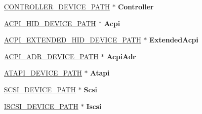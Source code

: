 \begin{DoxyCompactItemize}
\hyperlink{struct_c_o_n_t_r_o_l_l_e_r___d_e_v_i_c_e___p_a_t_h}{C\+O\+N\+T\+R\+O\+L\+L\+E\+R\+\_\+\+D\+E\+V\+I\+C\+E\+\_\+\+P\+A\+TH} $\ast$ {\bfseries Controller}
\item 
\mbox{\label{union_e_f_i___d_e_v___p_a_t_h___p_t_r_a564ac07625de5286d1533085b8459fb6}} 
\hyperlink{struct_a_c_p_i___h_i_d___d_e_v_i_c_e___p_a_t_h}{A\+C\+P\+I\+\_\+\+H\+I\+D\+\_\+\+D\+E\+V\+I\+C\+E\+\_\+\+P\+A\+TH} $\ast$ {\bfseries Acpi}
\item 
\mbox{\label{union_e_f_i___d_e_v___p_a_t_h___p_t_r_a3acbbd01771d58d0b9ba9e52127c0a05}} 
\hyperlink{struct_a_c_p_i___e_x_t_e_n_d_e_d___h_i_d___d_e_v_i_c_e___p_a_t_h}{A\+C\+P\+I\+\_\+\+E\+X\+T\+E\+N\+D\+E\+D\+\_\+\+H\+I\+D\+\_\+\+D\+E\+V\+I\+C\+E\+\_\+\+P\+A\+TH} $\ast$ {\bfseries Extended\+Acpi}
\item 
\mbox{\label{union_e_f_i___d_e_v___p_a_t_h___p_t_r_aabb9ab372c911ed1aa55e2231533b764}} 
\hyperlink{struct_a_c_p_i___a_d_r___d_e_v_i_c_e___p_a_t_h}{A\+C\+P\+I\+\_\+\+A\+D\+R\+\_\+\+D\+E\+V\+I\+C\+E\+\_\+\+P\+A\+TH} $\ast$ {\bfseries Acpi\+Adr}
\item 
\mbox{\label{union_e_f_i___d_e_v___p_a_t_h___p_t_r_afe0dc30e888d45832aa027c74b9c3313}} 
\hyperlink{struct_a_t_a_p_i___d_e_v_i_c_e___p_a_t_h}{A\+T\+A\+P\+I\+\_\+\+D\+E\+V\+I\+C\+E\+\_\+\+P\+A\+TH} $\ast$ {\bfseries Atapi}
\item 
\mbox{\label{union_e_f_i___d_e_v___p_a_t_h___p_t_r_a1cad1912450dbe179eb6ef8543748fef}} 
\hyperlink{struct_s_c_s_i___d_e_v_i_c_e___p_a_t_h}{S\+C\+S\+I\+\_\+\+D\+E\+V\+I\+C\+E\+\_\+\+P\+A\+TH} $\ast$ {\bfseries Scsi}
\item 
\mbox{\label{union_e_f_i___d_e_v___p_a_t_h___p_t_r_a2c65ba364d68b0638699a11c340bcd42}} 
\hyperlink{struct_i_s_c_s_i___d_e_v_i_c_e___p_a_t_h}{I\+S\+C\+S\+I\+\_\+\+D\+E\+V\+I\+C\+E\+\_\+\+P\+A\+TH} $\ast$ {\bfseries Iscsi}
\item 
\mbox{\label{union_e_f_i___d_e_v___p_a_t_h___p_t_r_a72fd6070f33569b340336a0baf666e81}} 

\end{DoxyCompactItemize}
